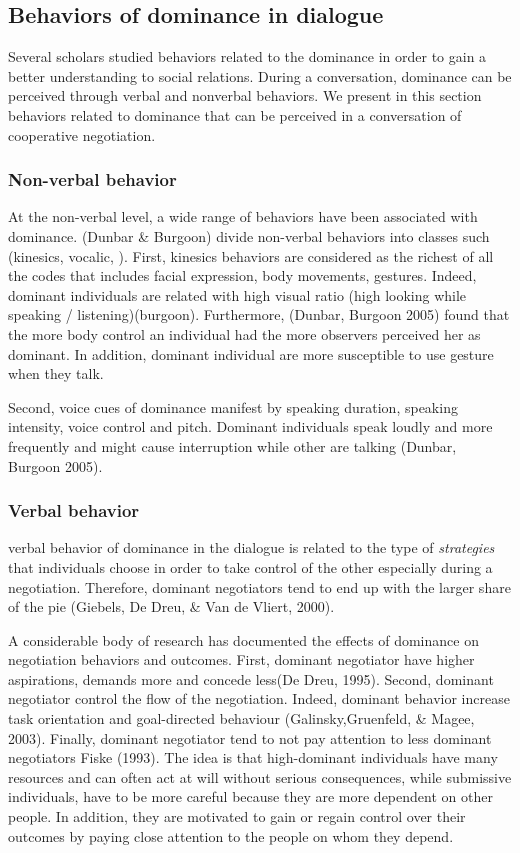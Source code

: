 \documentclass{llncs}
\begin{document}
 \subsection{Behaviors of dominance in dialogue}
  Several scholars studied behaviors related to the dominance in order to gain a better understanding to social relations. During a conversation, dominance can be perceived through verbal and nonverbal behaviors. We present in this section behaviors related to dominance that can be perceived in a conversation of cooperative negotiation.
 \subsubsection{Non-verbal behavior}
At the non-verbal level, a wide range of behaviors have been associated with dominance. (Dunbar \& Burgoon) divide non-verbal behaviors into classes such (kinesics, vocalic, ). First, kinesics behaviors are considered as the richest of all the codes that includes facial expression, body movements, gestures. Indeed, dominant individuals are related with high visual ratio (high looking while speaking / listening)(burgoon).  Furthermore, (Dunbar, Burgoon 2005) found that the more body control an individual had the more observers perceived her as dominant. In addition, dominant individual are more susceptible to use gesture when they talk.  
\par  Second, voice cues of dominance manifest by speaking duration, speaking intensity, voice control and pitch. Dominant individuals speak loudly and more frequently and might cause interruption while other are talking (Dunbar, Burgoon 2005).

 \subsubsection{Verbal behavior}
verbal behavior of dominance in the dialogue is related to the type of \textit{strategies} that individuals choose in order to take control of the other especially during a negotiation. Therefore, dominant negotiators tend to end up with the larger share of the pie (Giebels, De Dreu, \& Van de Vliert, 2000). 
\par A considerable body of research has documented the effects of dominance on negotiation behaviors and outcomes. First, dominant negotiator have higher aspirations, demands more and concede less(De Dreu, 1995). Second, dominant negotiator control the flow of the negotiation. Indeed, dominant behavior increase task orientation and goal-directed behaviour (Galinsky,Gruenfeld, \& Magee, 2003). Finally, dominant negotiator tend to not pay attention to less dominant negotiators Fiske (1993). The idea is that high-dominant individuals have many resources and can often act at will without serious consequences, while submissive individuals, have to be more careful because they are more dependent on other people. In addition, they are motivated to gain or regain control over their outcomes by paying close attention to the people on whom they depend.
\end{document}
